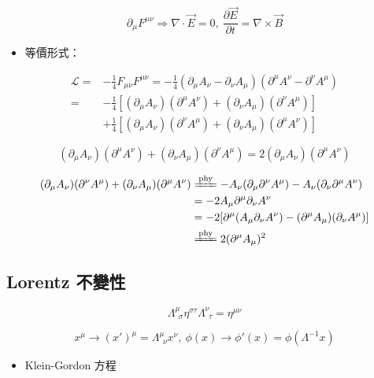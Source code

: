 \documentclass{article}
\begin{document}
$$\partial_{\mu}F^{\mu\nu}\Rightarrow\nabla\cdot\vec{E}=0,\ \frac{\partial\vec{E}}{\partial t}=\nabla\times\vec{B}$$

\begin{itemize}
\item 等價形式：
\end{itemize}

$$
\begin{aligned}
\mathcal{L}= & -\frac{1}{4}F_{\mu\nu}F^{\mu\nu}=-\frac{1}{4}(\partial_{\mu}A_{\nu}-\partial_{\nu}A_{\mu})(\partial^{\mu}A^{\nu}-\partial^{\nu}A^{\mu}) \\
=            & -\frac{1}{4}[(\partial_{\mu}A_{\nu})(\partial^{\mu}A^{\nu})+(\partial_{\nu}A_{\mu})(\partial^{\nu}A^{\mu})]                             \\
& +\frac{1}{4}[(\partial_{\mu}A_{\nu})(\partial^{\nu}A^{\mu})+(\partial_{\nu}A_{\mu})(\partial^{\mu}A^{\nu})]
\end{aligned}$$

$$(\partial_{\mu}A_{\nu})(\partial^{\mu}A^{\nu})+(\partial_{\nu}A_{\mu})(\partial^{\nu}A^{\mu})=2(\partial_{\mu}A_{\nu})(\partial^{\mu}A^{\nu})$$

$$
\begin{aligned}
(\partial_{\mu}A_{\nu})(\partial^{\nu}A^{\mu})+(\partial_{\nu}A_{\mu})(\partial^{\mu}A^{\nu}) & \xlongequal{\mathrm{phy}}-A_{\nu}(\partial_{\mu}\partial^{\nu}A^{\mu})-A_{\nu}(\partial_{\nu}\partial^{\mu}A^{\nu}) \\
& =-2A_{\mu}\partial^{\mu}\partial_{\nu}A^{\nu}                                                                       \\
& =-2[\partial^{\mu}(A_{\mu}\partial_{\nu}A^{\nu})-(\partial^{\mu}A_{\mu})(\partial_{\nu}A^{\mu})]                    \\
& \xlongequal{\mathrm{phy}}2(\partial^{\mu}A_{\mu})^2
\end{aligned}$$

\subsection{Lorentz 不變性}

$$\Lambda^{\mu}_{\ \ \sigma}\eta^{\sigma\tau}\Lambda^{\nu}_{\ \ \tau}=\eta^{\mu\nu}$$

$$x^{\mu}\to(x')^{\mu}=\Lambda^{\mu}_{\ \ \nu}x^\nu,\ \phi(x)\to\phi'(x)=\phi(\Lambda^{-1}x)$$

\begin{itemize}
\item Klein-Gordon 方程
\end{itemize}
\end{document}
